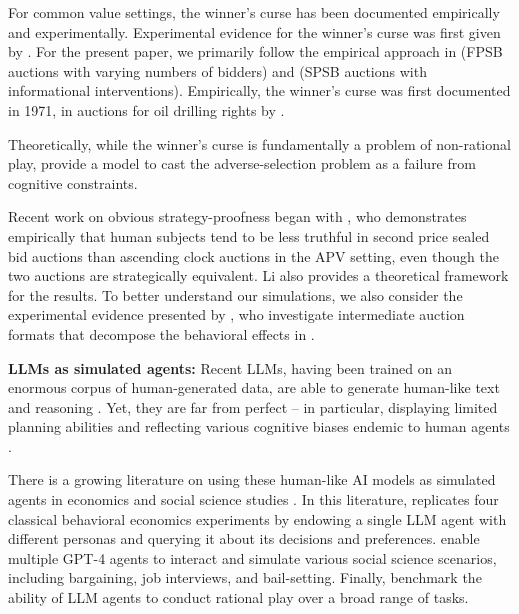 \documentclass{article} %
\begin{document}
For common value settings, the winner's curse has been documented empirically and experimentally. 
Experimental evidence for the winner's curse was first given by \citet{bazerman1983won}. 
For the present paper, we primarily follow the empirical approach in \citet{kagel1986winner} (FPSB auctions with varying numbers of bidders) and \citet{kagel1987information} (SPSB auctions with informational interventions). 
Empirically, the winner's curse was first documented in 1971, in auctions for oil drilling rights by \citet{capen1971competitive}. 

Theoretically, while the winner's curse is fundamentally a problem of non-rational play,  \citet{charness2009origin} provide a model to cast the adverse-selection problem as a failure from cognitive constraints. 


Recent work on obvious strategy-proofness began with \citet{li2017obviously}, who demonstrates empirically that human subjects tend to be less truthful in second price sealed bid auctions than ascending clock auctions in the APV setting, even though the two auctions are strategically equivalent. 
Li also provides a theoretical framework for the results. 
To better understand our simulations, we also consider the experimental evidence presented by \citet{breitmoser2022obviousness}, who investigate intermediate auction formats that decompose the behavioral effects in \citet{li2017obviously}. 

\textbf{LLMs as simulated agents:} Recent LLMs, having been trained on an enormous corpus of human-generated data, are able to generate human-like text and reasoning \citep{achiam2023gpt, bubeck2023sparks}. 
Yet, they are far from perfect -- in particular, displaying limited planning abilities and reflecting various cognitive biases endemic to human agents \citep{wan2023kelly}. 

There is a growing literature on using these human-like AI models as simulated agents in economics and social science studies \citep{aher2023using, park2023generative, brand2023using}. 
In this literature, \citet{horton2023large} replicates four classical behavioral economics experiments by endowing a single LLM agent with different personas and querying it about its decisions and preferences.
\citet{manning2024automated} enable multiple GPT-4 agents to interact and simulate various social science scenarios, including bargaining, job interviews, and bail-setting.
Finally, \citet{raman2024steerassessingeconomicrationality} benchmark the ability of LLM agents to conduct rational play over a broad range of tasks.
\end{document}
